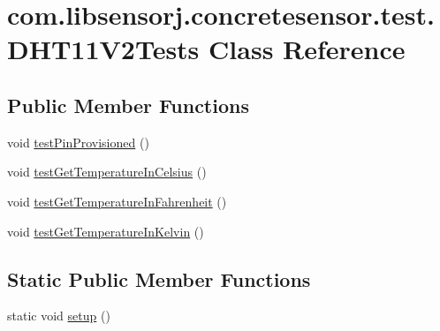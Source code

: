 \hypertarget{classcom_1_1libsensorj_1_1concretesensor_1_1test_1_1DHT11V2Tests}{}\section{com.\+libsensorj.\+concretesensor.\+test.\+D\+H\+T11\+V2\+Tests Class Reference}
\label{classcom_1_1libsensorj_1_1concretesensor_1_1test_1_1DHT11V2Tests}
\subsection*{Public Member Functions}
\begin{DoxyCompactItemize}
\item 
void \hyperlink{classcom_1_1libsensorj_1_1concretesensor_1_1test_1_1DHT11V2Tests_a3b18876deae5241ef9dfef1537b0f2cf}{test\+Pin\+Provisioned} ()
\item 
void \hyperlink{classcom_1_1libsensorj_1_1concretesensor_1_1test_1_1DHT11V2Tests_ad1c9d894b4d44242f1c910f17826e01b}{test\+Get\+Temperature\+In\+Celsius} ()
\item 
void \hyperlink{classcom_1_1libsensorj_1_1concretesensor_1_1test_1_1DHT11V2Tests_a16a3757f999072a6d9c756221151532d}{test\+Get\+Temperature\+In\+Fahrenheit} ()
\item 
void \hyperlink{classcom_1_1libsensorj_1_1concretesensor_1_1test_1_1DHT11V2Tests_a5ea11b7733a5e6756aa862e647cbfb6c}{test\+Get\+Temperature\+In\+Kelvin} ()
\end{DoxyCompactItemize}
\subsection*{Static Public Member Functions}
\begin{DoxyCompactItemize}
\item 
static void \hyperlink{classcom_1_1libsensorj_1_1concretesensor_1_1test_1_1DHT11V2Tests_a2993801bfd9837ef100800fcaa63dfea}{setup} ()
\end{DoxyCompactItemize}
